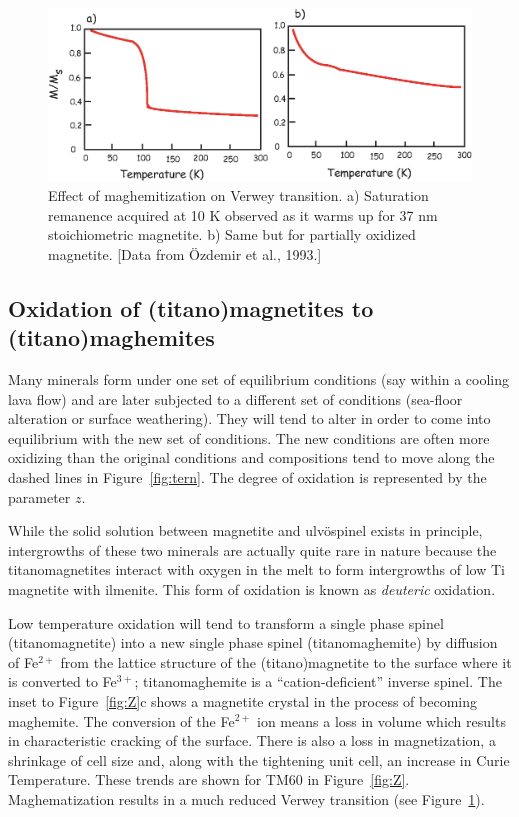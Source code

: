  \begin{figure}[htb]
\centering  \includegraphics[width=11 cm]{EPSfiles/suppress.eps}
\caption{Effect of maghemitization on Verwey transition.  a) Saturation remanence acquired at 10 K observed as it warms up for 37 nm stoichiometric magnetite.  b) Same but for partially oxidized magnetite. [Data from \"Ozdemir et al., 1993.]  }
\label{fig:suppress}
\end{figure}
\nocite{ozdemir93}


\subsection {Oxidation of (titano)magnetites to (titano)maghemites}

Many minerals form under one set of equilibrium conditions (say within a cooling lava flow) and are later subjected to a different set of conditions (sea-floor alteration or surface weathering).  They will tend to alter in order to come into equilibrium with the new set of conditions.   The new conditions are often more oxidizing than the original conditions and compositions tend to move along the dashed lines in Figure~\ref{fig:tern}.    The degree of oxidation is represented by the parameter $z$. 

While the solid solution between magnetite and ulv\"ospinel exists in principle, intergrowths of these two minerals are actually quite rare in nature because the titanomagnetites interact with oxygen in the melt to form intergrowths of low Ti magnetite with ilmenite.  This form of oxidation is known as 
{\it deuteric} oxidation.  


 

Low temperature oxidation will tend to transform a single phase spinel (titanomagnetite) into a new single phase spinel (titanomaghemite) by diffusion of  Fe$^{2+}$ from the lattice structure of the (titano)magnetite to the surface where it is converted to Fe$^{3+}$;  
titanomaghemite   is a ``cation-deficient''  inverse  spinel.     The inset to  Figure~\ref{fig:Z}c shows a magnetite crystal in the process of becoming maghemite.  The conversion of the Fe$^{2+}$ ion means a loss in volume which results in characteristic cracking of the surface.   There is also a loss in magnetization, a shrinkage of cell size and, along with the tightening unit cell, an increase in Curie Temperature.  These trends are shown for TM60 in Figure~\ref{fig:Z}.  Maghematization results in a much reduced Verwey transition (see Figure~\ref{fig:suppress}).  


